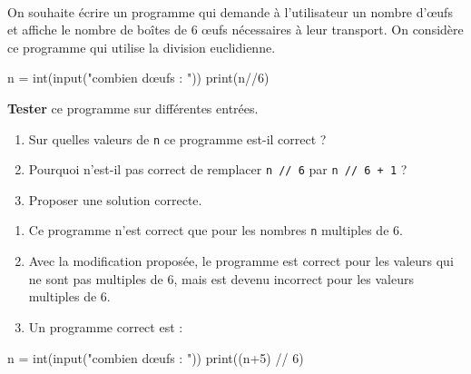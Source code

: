 \documentclass[a4paper,17pt]{extarticle}
\newenvironment{eleve}%
{\begin{activite}\color{noiramu}\\[-0.5cm]}
{\end{activite}}
\providecommand{\tightlist}{%
      \setlength{\itemsep}{0pt}\setlength{\parskip}{0pt}}
\newenvironment{Shaded}{}{}
\newcommand{\DecValTok}[1]{\textcolor[rgb]{0.25,0.63,0.44}{{#1}}}
\newcommand{\StringTok}[1]{\textcolor[rgb]{0.25,0.44,0.63}{{#1}}}
\newcommand{\NormalTok}[1]{{#1}}
\newcommand{\OperatorTok}[1]{\textcolor[rgb]{0.40,0.40,0.40}{{#1}}}
\newcommand{\BuiltInTok}[1]{{#1}}
\begin{document}
\begin{eleve}
    On souhaite écrire un programme qui demande à l'utilisateur un nombre
d'œufs et affiche le nombre de boîtes de 6 œufs nécessaires à leur
transport. On considère ce programme qui utilise la division
euclidienne.

\begin{Shaded}
\begin{Highlighting}[]
\NormalTok{n }\OperatorTok{=} \BuiltInTok{int}\NormalTok{(}\BuiltInTok{input}\NormalTok{(}\StringTok{"combien d\textquotesingle{}œufs : "}\NormalTok{))}
\BuiltInTok{print}\NormalTok{(n}\OperatorTok{//}\DecValTok{6}\NormalTok{)}
\end{Highlighting}
\end{Shaded}

\textbf{Tester} ce programme sur différentes entrées.

\begin{enumerate}
\def\labelenumi{\arabic{enumi}.}
\tightlist
\item
  Sur quelles valeurs de \texttt{n} ce programme est-il correct ?
\item
  Pourquoi n'est-il pas correct de remplacer \texttt{n\ //\ 6} par
  \texttt{n\ //\ 6\ +\ 1} ?
\item
  Proposer une solution correcte.
\end{enumerate}
        
        \end{eleve}\begin{reponse}
    \begin{enumerate}
\def\labelenumi{\arabic{enumi}.}
\tightlist
\item
  Ce programme n'est correct que pour les nombres \texttt{n} multiples
  de 6.
\item
  Avec la modification proposée, le programme est correct pour les
  valeurs qui ne sont pas multiples de 6, mais est devenu incorrect pour
  les valeurs multiples de 6.
\item
  Un programme correct est :
\end{enumerate}

\begin{Shaded}
\begin{Highlighting}[]
\NormalTok{n }\OperatorTok{=} \BuiltInTok{int}\NormalTok{(}\BuiltInTok{input}\NormalTok{(}\StringTok{"combien d\textquotesingle{}œufs : "}\NormalTok{))}
\BuiltInTok{print}\NormalTok{((n}\OperatorTok{+}\DecValTok{5}\NormalTok{) }\OperatorTok{//} \DecValTok{6}\NormalTok{)}
\end{Highlighting}
\end{Shaded}

        \end{reponse}

    
    
    
\end{document}
